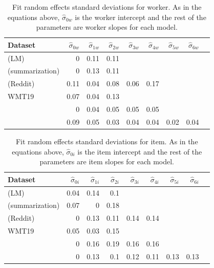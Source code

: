 \documentclass[11pt,a4paper]{article}
\begin{document}
\begin{table}[]
\centering \small
\begin{tabular}{lrrrrrrrr}
  \hline
Dataset & $\hat{\sigma}_{0w}$ & $\hat{\sigma}_{1w}$ & $\hat{\sigma}_{2w}$  & $\hat{\sigma}_{3w}$  & $\hat{\sigma}_{4w}$  & $\hat{\sigma}_{5w}$  & $\hat{\sigma}_{6w}$  \\ 
  \hline
\citet{hashimoto2019unifying} (LM) & 0 & 0.11 & 0.11 &  &  &  &  \\ 
  \citet{hashimoto2019unifying} (summarization) & 0 & 0.13 & 0.11 &  &  &  &  \\ 
    \citet{hashimoto2019unifying} (Reddit) & 0.11 & 0.04 & 0.08 & 0.06 & 0.17 &  &  \\ 
  WMT19 & 0.07 & 0.04 & 0.13 &  &  &  &  \\ 
  \citet{dathathri.2020}  & 0 & 0.04 & 0.05 & 0.05 & 0.05 &  &  \\ 
  \citet{holtzman.2020} & 0.09 & 0.05 & 0.03 & 0.04 & 0.04 & 0.02 & 0.04 \\ 
   \hline
\end{tabular}
\caption{Fit random effects standard deviations for worker. As in the equations above, $\hat{\sigma}_{0w}$ is the worker intercept and the rest of the parameters are worker slopes for each model.} 
\label{table:worker}
\end{table}

\begin{table}[]
\centering \small
\begin{tabular}{lrrrrrrrr}
  \hline
Dataset & $\hat{\sigma}_{0i}$ & $\hat{\sigma}_{1i}$ & $\hat{\sigma}_{2i}$  & $\hat{\sigma}_{3i}$  & $\hat{\sigma}_{4i}$  & $\hat{\sigma}_{5i}$  & $\hat{\sigma}_{6i}$  \\ 
  \hline
\citet{hashimoto2019unifying} (LM) & 0.04 & 0.14 & 0.1 &  &  &  &  \\ 
  \citet{hashimoto2019unifying} (summarization) & 0.07 & 0 & 0.18 &  &  &  &  \\
  \citet{hashimoto2019unifying} (Reddit) & 0 & 0.13 & 0.11 & 0.14 & 0.14 &  &  \\ 
  WMT19 & 0.05 & 0.03 & 0.15 &  &  &  &  \\ 
  \citet{dathathri.2020}  & 0 & 0.16 & 0.19 & 0.16 & 0.16 &  &  \\ 
  \citet{holtzman.2020} & 0 & 0.13 & 0.1 & 0.12 & 0.11 & 0.13 & 0.13 \\ 
   \hline
\end{tabular}
\caption{Fit random effects standard deviations for item. As in the equations above, $\hat{\sigma}_{0i}$ is the item intercept and the rest of the parameters are item slopes for each model.} 
\label{table:item}
\end{table}
\end{document}

